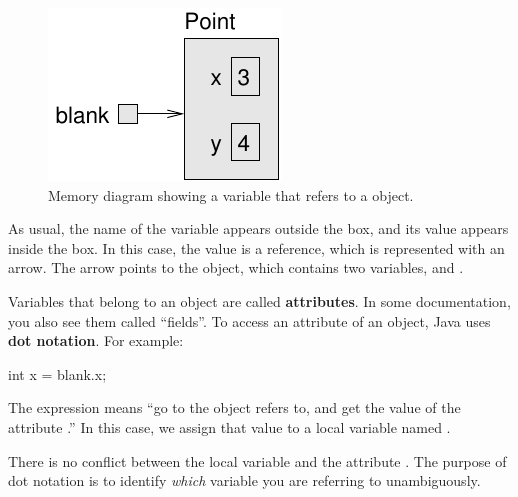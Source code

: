 
\begin{figure}[!ht]
\begin{center}
\includegraphics{figs/reference.pdf}
\caption{Memory diagram showing a variable that refers to a  object.}
\label{fig.reference}
\end{center}
\end{figure}


As usual, the name of the variable  appears outside the box, and its value appears inside the box.
In this case, the value is a reference, which is represented with an arrow.
The arrow points to the  object, which contains two variables,  and .




Variables that belong to an object are called {\bf attributes}.
In some documentation, you also see them called ``fields''.
To access an attribute of an object, Java uses {\bf dot notation}.
For example:

\begin{code}
int x = blank.x;
\end{code}

The expression  means ``go to the object  refers to, and get the value of the attribute .''
In this case, we assign that value to a local variable named .

There is no conflict between the local variable  and the attribute .
The purpose of dot notation is to identify {\em which} variable you are referring to unambiguously.

